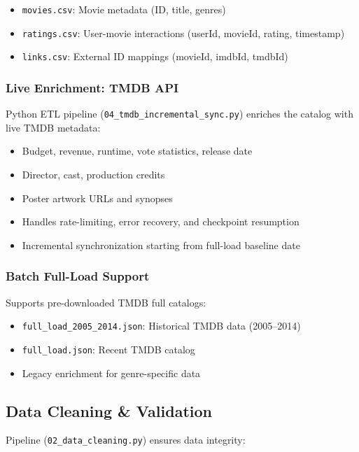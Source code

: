 \documentclass[11pt,a4paper]{article}
\begin{document}
\begin{itemize}
    \item \texttt{movies.csv}: Movie metadata (ID, title, genres)
    \item \texttt{ratings.csv}: User-movie interactions (userId, movieId, rating, timestamp)
    \item \texttt{links.csv}: External ID mappings (movieId, imdbId, tmdbId)
\end{itemize}

\subsubsection{Live Enrichment: TMDB API}

Python ETL pipeline (\texttt{04\_tmdb\_incremental\_sync.py}) enriches the catalog with live TMDB metadata:

\begin{itemize}
    \item Budget, revenue, runtime, vote statistics, release date
    \item Director, cast, production credits
    \item Poster artwork URLs and synopses
    \item Handles rate-limiting, error recovery, and checkpoint resumption
    \item Incremental synchronization starting from full-load baseline date
\end{itemize}

\subsubsection{Batch Full-Load Support}

Supports pre-downloaded TMDB full catalogs:

\begin{itemize}
    \item \texttt{full\_load\_2005\_2014.json}: Historical TMDB data (2005–2014)
    \item \texttt{full\_load.json}: Recent TMDB catalog
    \item Legacy enrichment for genre-specific data
\end{itemize}

\subsection{Data Cleaning \& Validation}

Pipeline (\texttt{02\_data\_cleaning.py}) ensures data integrity:
\end{document}
